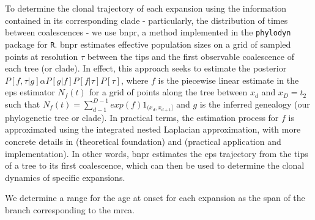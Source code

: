 To determine the clonal trajectory of each expansion using the information contained in its corresponding clade - particularly, the distribution of times between coalescences - we use \ac{bnpr}, a method implemented in the \texttt{phylodyn} \cite{Lan2015-sw,Karcher2017-kt} package for \texttt{R}. \ac{bnpr} estimates effective population sizes on a grid of sampled points at resolution $\tau$ between the tips and the first observable coalescence of each tree (or clade). In effect, this approach seeks to estimate the posterior $P[f,\tau|g]\alpha P[g|f]P[f|\tau]P[\tau]$, where $f$ is the piecewise linear estimate in the \ac{eps} estimator $N_f(t)$ for a grid of points along the tree between $x_d$ and $x_D=t_2$ such that $N_f(t) = \sum^{D-1}_{d-1}exp(f)1_{(x_d,x_{d+1}]}$ and $g$ is the inferred genealogy (our phylogenetic tree or clade). In practical terms, the estimation process for $f$ is approximated using the integrated nested Laplacian approximation, with more concrete details in \cite{Lan2015-sw} (theoretical foundation) and \cite{Karcher2017-kt} (practical application and implementation). In other words, \ac{bnpr} estimates the \ac{eps} trajectory from the tips of a tree to its first coalescence, which can then be used to determine the clonal dynamics of specific expansions.



We determine a range for the age at onset for each expansion as the span of the branch corresponding to the \ac{mrca}. 